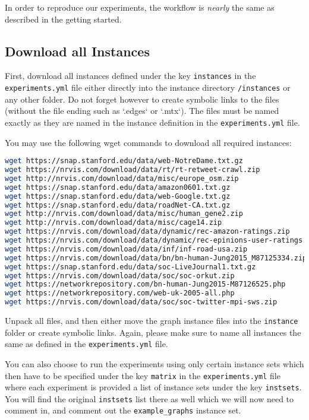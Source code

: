 \documentclass[11pt, a4paper]{scrartcl}
\newcommand{\expfile}{\texttt{experiments.yml} file\xspace}
\begin{document}
In order to reproduce our experiments, the workflow is \emph{nearly} the same as
described in the getting started.

\subsection{Download all Instances}

First, download all instances defined under the key \texttt{instances} in the
\expfile either directly into the instance directory \texttt{/instances} or
any other folder. Do not forget however to create symbolic links to the
files (without the file ending such as `.edges` or `.mtx`). The files must
be named exactly as they are named in the instance definition in the
\expfile.

You may use the following wget commands to download all required instances:

\begin{lstlisting}[language=bash]
wget https://snap.stanford.edu/data/web-NotreDame.txt.gz
wget https://nrvis.com/download/data/rt/rt-retweet-crawl.zip
wget http://nrvis.com/download/data/misc/europe_osm.zip
wget https://snap.stanford.edu/data/amazon0601.txt.gz
wget https://snap.stanford.edu/data/web-Google.txt.gz
wget https://snap.stanford.edu/data/roadNet-CA.txt.gz
wget http://nrvis.com/download/data/misc/human_gene2.zip
wget http://nrvis.com/download/data/misc/cage14.zip
wget https://nrvis.com/download/data/dynamic/rec-amazon-ratings.zip
wget https://nrvis.com/download/data/dynamic/rec-epinions-user-ratings.zip
wget https://nrvis.com/download/data/inf/inf-road-usa.zip
wget https://nrvis.com/download/data/bn/bn-human-Jung2015_M87125334.zip
wget https://snap.stanford.edu/data/soc-LiveJournal1.txt.gz
wget https://nrvis.com/download/data/soc/soc-orkut.zip
wget https://networkrepository.com/bn-human-Jung2015-M87126525.php
wget https://networkrepository.com/web-uk-2005-all.php
wget https://nrvis.com/download/data/soc/soc-twitter-mpi-sws.zip
\end{lstlisting}

Unpack all files, and then either move the graph instance files into the
\texttt{instance} folder or create symbolic links. Again, please make sure to
name all instances the same as defined in the \expfile.

You can also choose to run the experiments using only certain instance sets
which then have to be specified under the key \texttt{matrix} in the \expfile
where each experiment is provided a list of instance sets under the key
\texttt{instsets}. You will find the original \texttt{instsets} list there as
well which we will now need to comment in, and comment out the
\texttt{example\_graphs} instance set.
\end{document}
